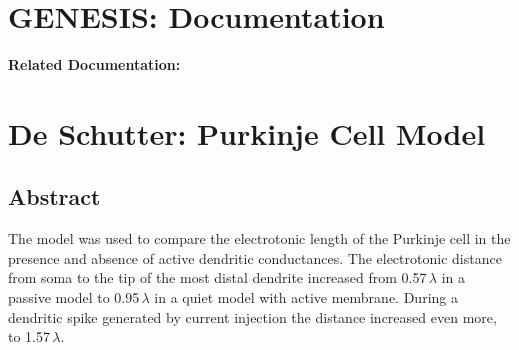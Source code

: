 \documentclass[12pt]{article}
\begin{document}
\section*{GENESIS: Documentation}

{\bf Related Documentation:}

\section*{De Schutter: Purkinje Cell Model}

\subsection*{Abstract}

The model was used to compare the electrotonic length of
the Purkinje cell in the presence and absence of active dendritic
conductances. The electrotonic distance from soma to the tip of
the most distal dendrite increased from 0.57\,$\lambda$ in a passive model
to 0.95\,$\lambda$ in a quiet model with active membrane. During a dendritic
spike generated by current injection the distance increased
even more, to 1.57\,$\lambda$.
\end{document}
